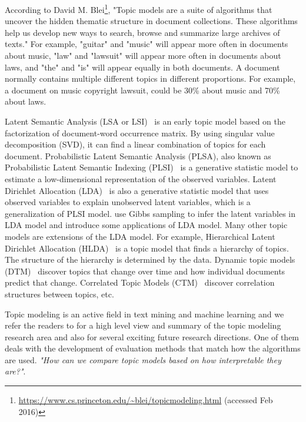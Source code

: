 According to David M. Blei\footnote{\url{https://www.cs.princeton.edu/~blei/topicmodeling.html} (accessed Feb 2016)}, "Topic models are a suite of algorithms that uncover the hidden thematic structure in document collections. These algorithms help us develop new ways to search, browse and summarize large archives of texts." For example, "guitar" and "music" will appear more often in documents about music, "law" and "lawsuit" will appear more often in documents about laws, and "the" and "is" will appear equally in both documents. A document normally contains multiple different topics in different proportions. For example, a document on music copyright lawsuit, could be 30\% about music and 70\% about laws.

Latent Semantic Analysis (LSA or LSI)~\cite{chp2deerwester1990indexing} \cite{chp2landauer1997solution} is an early topic model based on the factorization of document-word occurrence matrix. By using singular value decomposition (SVD), it can find a linear combination of topics for each document.
Probabilistic Latent Semantic Analysis (PLSA), also known as Probabilistic Latent Semantic Indexing (PLSI)~\cite{chp2papadimitriou1998latent}\cite{chp2hofmann1999probabilistic} is a generative statistic model to estimate a low-dimensional representation of the observed variables. Latent Dirichlet Allocation (LDA)~\cite{blei2003latent} is also a generative statistic model that uses observed variables to explain unobserved latent variables, which is a generalization of PLSI model. \cite{griffiths2004finding} \cite{chp2griffiths2002probabilistic} use Gibbs sampling to infer the latent variables in LDA model and introduce some applications of LDA model. Many other topic models are extensions of the LDA model. For example, Hierarchical Latent Dirichlet Allocation (HLDA)~\cite{chp2DBLP:conf/nips/2003} is a topic model that finds a hierarchy of topics. The structure of the hierarchy is determined by the data. Dynamic topic models (DTM)~\cite{chp2blei2006dynamic} discover topics that change over time and how individual documents predict that change. Correlated Topic Models (CTM)~\cite{chp2blei2006correlated} discover correlation structures between topics, etc.

Topic modeling is an active field in text mining and machine learning and we refer the readers to \cite{chp2Blei:2012:PTM:2133806.2133826} for a high level view and summary of the topic modeling research area and also for several exciting future research directions. One of them deals with the  development of evaluation methods that match how the algorithms are used. 
\textit{"How can we compare topic models based on how interpretable they are?"}.

